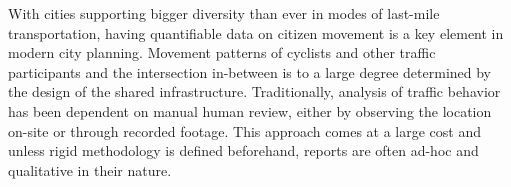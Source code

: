 With cities supporting bigger diversity than ever in modes of last-mile transportation,
having quantifiable data on citizen movement is a key element in modern city planning. 
Movement patterns of cyclists and other traffic participants and the intersection in-between 
is to a large degree determined by the design of the shared infrastructure. 
Traditionally, analysis of traffic behavior has been dependent on manual human review, either by 
observing the location on-site or through recorded footage. This approach comes at a large cost 
and unless rigid methodology is defined beforehand, reports are often ad-hoc and qualitative in 
their nature.